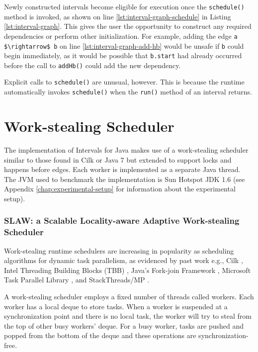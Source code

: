 Newly constructed intervals become eligible for execution once the
\lstinline|schedule()| method is invoked, as shown on line
\ref{lst:interval-graph-schedule} in Listing
\ref{lst:interval-graph}. This gives the user the opportunity to
construct any required dependencies or perform other
initialization. For example, adding the edge
\lstinline|a $\rightarrow$ b| on line \ref{lst:interval-graph-add-hb}
would be unsafe if \lstinline|b| could begin immediately, as it would
be possible that \lstinline|b.start| had already occurred before the
call to \lstinline|addHb()| could add the new dependency.

Explicit calls to \lstinline|schedule()| are unusual, however. This is
because the runtime automatically invokes \lstinline|schedule()| when
the \lstinline|run()| method of an interval returns.


\section{Work-stealing Scheduler}
\label{sec:intro-work-stealing-scheduler}


The implementation of Intervals for Java makes use of a work-stealing
scheduler similar to those found in Cilk \cite{Blumofe1995} or Java 7
\cite{Lea2006} but extended to support locks and happens before
edges. Each worker is implemented as a separate Java thread. The JVM
used to benchmark the implementation is Sun Hotspot JDK 1.6 (see
Appendix \ref{chap:experimental-setup} for information about the
experimental setup).


\subsubsection{SLAW: a Scalable Locality-aware Adaptive Work-stealing
  Scheduler \cite{Guo2010}}

Work-stealing runtime schedulers are increasing in popularity as
scheduling algorithms for dynamic task parallelism, as evidenced by
past work e.g., Cilk \cite{Frigo1998}, Intel Threading Building Blocks
(TBB) \cite{Reinders2007, Contreras2008}, Java's Fork-join Framework
\cite{Lea2000, Lea2000a}, Microsoft Task Parallel Library
\cite{Leijen2009}, and StackThreads/MP \cite{Taura1999}.

A work-stealing scheduler employs a fixed number of threads called
workers. Each worker has a local deque to store tasks. When a worker
is suspended at a synchronization point and there is no local task,
the worker will try to steal from the top of other busy workers'
deque. For a busy worker, tasks are pushed and popped from the bottom
of the deque and these operations are synchronization-free.

